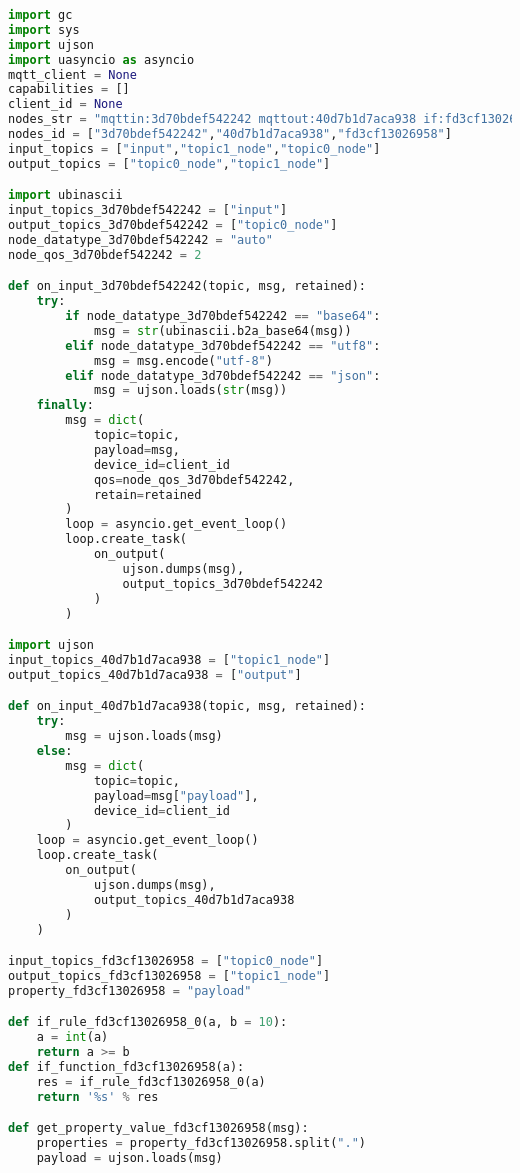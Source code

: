 \begin{lstlisting}[language=Python, caption={Code generated from the flow presented in Figure \ref{fig:code_generation_flow}.}, captionpos=b, label={lst:code_generation}]
import gc
import sys
import ujson
import uasyncio as asyncio
mqtt_client = None
capabilities = []
client_id = None
nodes_str = "mqttin:3d70bdef542242 mqttout:40d7b1d7aca938 if:fd3cf13026958"
nodes_id = ["3d70bdef542242","40d7b1d7aca938","fd3cf13026958"]
input_topics = ["input","topic1_node","topic0_node"]
output_topics = ["topic0_node","topic1_node"]

import ubinascii
input_topics_3d70bdef542242 = ["input"]
output_topics_3d70bdef542242 = ["topic0_node"]
node_datatype_3d70bdef542242 = "auto"
node_qos_3d70bdef542242 = 2

def on_input_3d70bdef542242(topic, msg, retained):
    try:
        if node_datatype_3d70bdef542242 == "base64":
            msg = str(ubinascii.b2a_base64(msg))
        elif node_datatype_3d70bdef542242 == "utf8":
            msg = msg.encode("utf-8")
        elif node_datatype_3d70bdef542242 == "json":
            msg = ujson.loads(str(msg))
    finally:
        msg = dict(
            topic=topic,
            payload=msg,
            device_id=client_id
            qos=node_qos_3d70bdef542242,
            retain=retained
        )
        loop = asyncio.get_event_loop()
        loop.create_task(
            on_output(
                ujson.dumps(msg),
                output_topics_3d70bdef542242
            )
        )

import ujson
input_topics_40d7b1d7aca938 = ["topic1_node"]
output_topics_40d7b1d7aca938 = ["output"]

def on_input_40d7b1d7aca938(topic, msg, retained):
    try:
        msg = ujson.loads(msg)
    else:
        msg = dict(
            topic=topic,
            payload=msg["payload"],
            device_id=client_id
        )            
    loop = asyncio.get_event_loop()
    loop.create_task(
        on_output(
            ujson.dumps(msg),
            output_topics_40d7b1d7aca938
        )
    )

input_topics_fd3cf13026958 = ["topic0_node"]
output_topics_fd3cf13026958 = ["topic1_node"]
property_fd3cf13026958 = "payload"

def if_rule_fd3cf13026958_0(a, b = 10):
    a = int(a)
    return a >= b
def if_function_fd3cf13026958(a):
    res = if_rule_fd3cf13026958_0(a)
    return '%s' % res

def get_property_value_fd3cf13026958(msg):
    properties = property_fd3cf13026958.split(".")
    payload = ujson.loads(msg)


\end{lstlisting}
